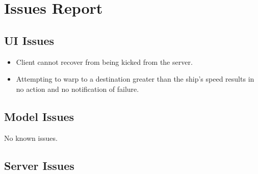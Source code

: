 \chapter{Issues Report}

\section{UI Issues}
\begin{itemize}
    \item Client cannot recover from being kicked from the server.
    \item Attempting to warp to a destination greater than the ship's speed results in no action and no notification of failure.
\end{itemize}

\section{Model Issues}
No known issues.

\section{Server Issues}
